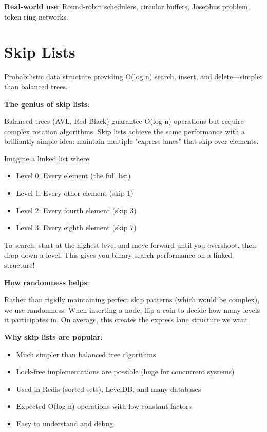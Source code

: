 \textbf{Real-world use}: Round-robin schedulers, circular buffers, Josephus problem, token ring networks.

\section{Skip Lists}

Probabilistic data structure providing O(log n) search, insert, and delete---simpler than balanced trees.

\textbf{The genius of skip lists}:

Balanced trees (AVL, Red-Black) guarantee O(log n) operations but require complex rotation algorithms. Skip lists achieve the same performance with a brilliantly simple idea: maintain multiple "express lanes" that skip over elements.

Imagine a linked list where:
\begin{itemize}
    \item Level 0: Every element (the full list)
    \item Level 1: Every other element (skip 1)
    \item Level 2: Every fourth element (skip 3)
    \item Level 3: Every eighth element (skip 7)
\end{itemize}

To search, start at the highest level and move forward until you overshoot, then drop down a level. This gives you binary search performance on a linked structure!

\textbf{How randomness helps}:

Rather than rigidly maintaining perfect skip patterns (which would be complex), we use randomness. When inserting a node, flip a coin to decide how many levels it participates in. On average, this creates the express lane structure we want.

\textbf{Why skip lists are popular}:
\begin{itemize}
    \item Much simpler than balanced tree algorithms
    \item Lock-free implementations are possible (huge for concurrent systems)
    \item Used in Redis (sorted sets), LevelDB, and many databases
    \item Expected O(log n) operations with low constant factors
    \item Easy to understand and debug
\end{itemize}

